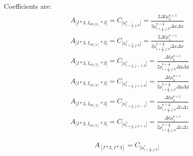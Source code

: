 \documentclass{article}
\numberwithin{equation}{subsection}
\begin{document}
Coefficients are:
\begin{align}
\begin{split}
& A_{\Big[I*3,I_{nb[0]}*3\Big]} = C_{\Big[u^*_{i-\frac{1}{2},j,k}\Big]} = \frac{2 \Delta t \mu^{n+1}_0}{3 \rho^{n+\frac{1}{2}}_{i+\frac{1}{2},j,k} \Delta x \Delta x} \\
& A_{\Big[I*3,I_{nb[1]}*3\Big]} = C_{\Big[u^*_{i+\frac{3}{2},j,k}\Big]} = \frac{2 \Delta t \mu^{n+1}_1}{3 \rho^{n+\frac{1}{2}}_{i+\frac{1}{2},j,k} \Delta x \Delta x} \\
& A_{\Big[I*3,I_{nb[2]}*3\Big]} = C_{\Big[u^*_{i+\frac{1}{2},j-1,k}\Big]} = \frac{ \Delta t \mu^{n+1}_2}{2 \rho^{n+\frac{1}{2}}_{i+\frac{1}{2},j,k} \Delta y \Delta y} \\
& A_{\Big[I*3,I_{nb[3]}*3\Big]} = C_{\Big[u^*_{i+\frac{1}{2},j+1,k}\Big]} = \frac{ \Delta t \mu^{n+1}_3}{2 \rho^{n+\frac{1}{2}}_{i+\frac{1}{2},j,k} \Delta y \Delta y} \\
& A_{\Big[I*3,I_{nb[4]}*3\Big]} = C_{\Big[u^*_{i+\frac{1}{2},j,k-1}\Big]} = \frac{ \Delta t \mu^{n+1}_4}{2 \rho^{n+\frac{1}{2}}_{i+\frac{1}{2},j,k} \Delta z \Delta z} \\
& A_{\Big[I*3,I_{nb[5]}*3\Big]} = C_{\Big[u^*_{i+\frac{1}{2},j,k+1}\Big]} = \frac{ \Delta t \mu^{n+1}_5}{2 \rho^{n+\frac{1}{2}}_{i+\frac{1}{2},j,k} \Delta z \Delta z} 
\end{split}
\end{align}

\begin{equation}
A_{[I*3,I*3]} = C_{\Big[u^*_{i+\frac{1}{2},j,k}\Big]}
\end{equation}
\end{document}
